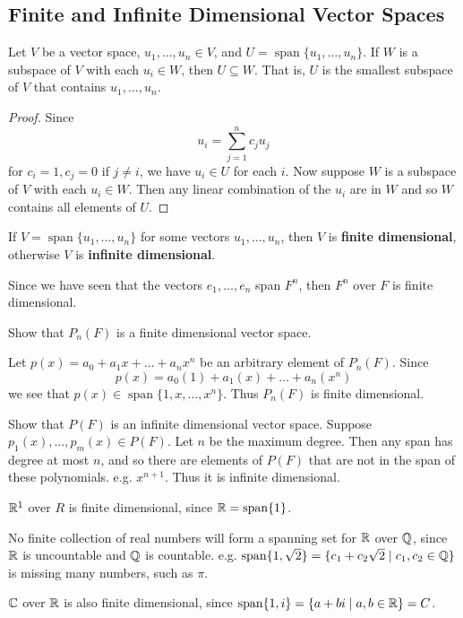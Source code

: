 \documentclass{article}
\DeclareMathOperator{\spn}{span}
\begin{document}
\subsection{Finite and Infinite Dimensional Vector Spaces}
\begin{theorem}
  Let $V$ be a vector space, $u_1, \ldots, u_n \in V$, and $U = \spn\{u_1, \ldots, u_n\}$. If $W$ is a subspace of $V$ with each $u_i \in W$, then $U \subseteq W$. That is, $U$ is the smallest subspace of $V$ that contains $u_1, \ldots, u_n$.
\end{theorem}
\begin{proof}
  Since
  \[
    u_i = \sum_{j=1}^n c_ju_j
  \]
  for $c_i = 1, c_j = 0$ if $j \neq i$, we have $u_i \in U$ for each $i$. Now suppose $W$ is a subspace of $V$ with each $u_i \in W$. Then any linear combination of the $u_i$ are in $W$ and so $W$ contains all elements of $U$.
\end{proof}
\begin{definition}
  If $V = \spn \{u_1, \ldots, u_n\}$ for some vectors $u_1, \ldots, u_n$, then $V$ is \textbf{finite dimensional}, otherwise $V$ is \textbf{infinite dimensional}.
\end{definition}
\begin{example}
  Since we have seen that the vectors $e_1, \ldots, e_n$ span $F^n$, then $F^n$ over $F$ is finite dimensional.
\end{example}
\begin{example}
  Show that $P_n(F)$ is a finite dimensional vector space.

  Let $p(x) = a_0 + a_1x + \dots + a_nx^n$ be an arbitrary element of $P_n(F)$. Since \[
    p(x) = a_0(1) + a_1(x) + \dots + a_n(x^n)
  \]
  we see that $p(x) \in \spn\{1, x, \ldots, x^n\}$. Thus $P_n(F)$ is finite dimensional.
\end{example}
\begin{example}
  Show that $P(F)$ is an infinite dimensional vector space. Suppose $p_1(x), \ldots, p_m(x) \in P(F)$. Let $n$ be the maximum degree. Then any span has degree at most $n$, and so there are elements of $P(F)$ that are not in the span of these polynomials. e.g. $x^{n+1}$. Thus it is infinite dimensional.
\end{example}
\begin{proposition}
  $\mathbb{R}^1$ over $R$ is finite dimensional, since $\R = \spn\{1\}$.

  No finite collection of real numbers will form a spanning set for $\mathbb{R}$ over $\mathbb{Q}$, since $\mathbb{R}$ is uncountable and $\mathbb{Q}$ is countable. e.g. $\spn\{1, \sqrt{2}\} = \{c_1 + c_2\sqrt{2} \mid c_1, c_2 \in \Q\}$ is missing many numbers, such as $\pi$.

  $\mathbb{C}$ over $\mathbb{R}$ is also finite dimensional, since $\spn\{1, i\} = \{a + bi \mid a, b \in \R\} = C$.
\end{proposition}
\end{document}
